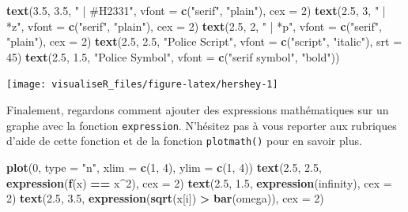 \documentclass[]{article}
\newenvironment{Shaded}{\begin{snugshade}}{\end{snugshade}}
\newcommand{\DataTypeTok}[1]{\textcolor[rgb]{0.13,0.29,0.53}{#1}}
\newcommand{\DecValTok}[1]{\textcolor[rgb]{0.00,0.00,0.81}{#1}}
\newcommand{\FloatTok}[1]{\textcolor[rgb]{0.00,0.00,0.81}{#1}}
\newcommand{\KeywordTok}[1]{\textcolor[rgb]{0.13,0.29,0.53}{\textbf{#1}}}
\newcommand{\NormalTok}[1]{#1}
\newcommand{\OperatorTok}[1]{\textcolor[rgb]{0.81,0.36,0.00}{\textbf{#1}}}
\newcommand{\StringTok}[1]{\textcolor[rgb]{0.31,0.60,0.02}{#1}}
\begin{document}
\begin{Shaded}
\begin{Highlighting}[]
\KeywordTok{text}\NormalTok{(}\FloatTok{3.5}\NormalTok{, }\FloatTok{3.5}\NormalTok{, }\StringTok{" | #H2331"}\NormalTok{, }\DataTypeTok{vfont =} \KeywordTok{c}\NormalTok{(}\StringTok{"serif"}\NormalTok{, }\StringTok{"plain"}\NormalTok{), }\DataTypeTok{cex =} \DecValTok{2}\NormalTok{)}
\KeywordTok{text}\NormalTok{(}\FloatTok{2.5}\NormalTok{, }\DecValTok{3}\NormalTok{, }\StringTok{" | *z"}\NormalTok{, }\DataTypeTok{vfont =} \KeywordTok{c}\NormalTok{(}\StringTok{"serif"}\NormalTok{, }\StringTok{"plain"}\NormalTok{), }\DataTypeTok{cex =} \DecValTok{2}\NormalTok{)}
\KeywordTok{text}\NormalTok{(}\FloatTok{2.5}\NormalTok{, }\DecValTok{2}\NormalTok{, }\StringTok{" | *p"}\NormalTok{, }\DataTypeTok{vfont =} \KeywordTok{c}\NormalTok{(}\StringTok{"serif"}\NormalTok{, }\StringTok{"plain"}\NormalTok{), }\DataTypeTok{cex =} \DecValTok{2}\NormalTok{)}
\KeywordTok{text}\NormalTok{(}\FloatTok{2.5}\NormalTok{, }\FloatTok{2.5}\NormalTok{, }\StringTok{"Police Script"}\NormalTok{,}
\DataTypeTok{vfont =} \KeywordTok{c}\NormalTok{(}\StringTok{"script"}\NormalTok{, }\StringTok{"italic"}\NormalTok{), }\DataTypeTok{srt =} \DecValTok{45}\NormalTok{)}
\KeywordTok{text}\NormalTok{(}\FloatTok{2.5}\NormalTok{, }\FloatTok{1.5}\NormalTok{, }\StringTok{"Police Symbol"}\NormalTok{,}
\DataTypeTok{vfont =} \KeywordTok{c}\NormalTok{(}\StringTok{"serif symbol"}\NormalTok{, }\StringTok{"bold"}\NormalTok{))}
\end{Highlighting}
\end{Shaded}

\begin{center}\texttt{[image: visualiseR\_files/figure-latex/hershey-1]} \end{center}

Finalement, regardons comment ajouter des expressions mathématiques sur un graphe avec la fonction \texttt{expression}. N'hésitez pas à vous reporter aux rubriques d'aide de cette fonction et de la fonction \texttt{plotmath()} pour en savoir plus.

\begin{Shaded}
\begin{Highlighting}[]
\KeywordTok{plot}\NormalTok{(}\DecValTok{0}\NormalTok{, }\DataTypeTok{type =} \StringTok{"n"}\NormalTok{, }\DataTypeTok{xlim =} \KeywordTok{c}\NormalTok{(}\DecValTok{1}\NormalTok{, }\DecValTok{4}\NormalTok{), }\DataTypeTok{ylim =} \KeywordTok{c}\NormalTok{(}\DecValTok{1}\NormalTok{, }\DecValTok{4}\NormalTok{))}
\KeywordTok{text}\NormalTok{(}\FloatTok{2.5}\NormalTok{, }\FloatTok{2.5}\NormalTok{, }\KeywordTok{expression}\NormalTok{(}\KeywordTok{f}\NormalTok{(x) }\OperatorTok{==}\StringTok{ }\NormalTok{x}\OperatorTok{^}\DecValTok{2}\NormalTok{), }\DataTypeTok{cex =} \DecValTok{2}\NormalTok{)}
\KeywordTok{text}\NormalTok{(}\FloatTok{2.5}\NormalTok{, }\FloatTok{1.5}\NormalTok{, }\KeywordTok{expression}\NormalTok{(infinity), }\DataTypeTok{cex =} \DecValTok{2}\NormalTok{)}
\KeywordTok{text}\NormalTok{(}\FloatTok{2.5}\NormalTok{, }\FloatTok{3.5}\NormalTok{, }\KeywordTok{expression}\NormalTok{(}\KeywordTok{sqrt}\NormalTok{(x[i]) }\OperatorTok{>}\StringTok{ }\KeywordTok{bar}\NormalTok{(omega)), }\DataTypeTok{cex =} \DecValTok{2}\NormalTok{)}
\end{Highlighting}
\end{Shaded}
\end{document}
